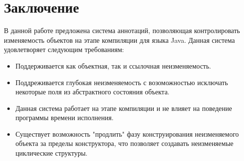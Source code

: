 \chapter{Заключение}

В данной работе предложена система аннотаций, позволяющая контролировать изменяемость объектов на этапе компиляции для языка Java. Данная система удовлетворяет следующим требованиям:
\begin{itemize}
	\item Поддерживается как объектная, так и ссылочная неизменяемость.
	\item Поддреживается глубокая неизменяемость с возоможностью исключать некоторые поля из абстрактного состояния объекта.
	\item Данная система работает на этапе компиляции и не влияет на поведение программы времени исполнения.
	\item Существует возможность "продлить" фазу конструирования неизменяемого объекта за пределы конструктора, что позволяет создавать неизменяемые циклические структуры.
\end{itemize}



